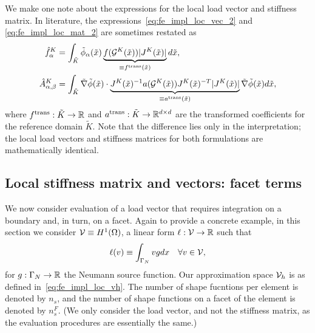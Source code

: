 We make one note about the expressions for the local load vector and stiffness matrix.  In literature, the expressions~\eqref{eq:fe_impl_loc_vec_2} and \eqref{eq:fe_impl_loc_mat_2} are sometimes restated as
\begin{align*}
  \hat f^K_\alpha
  &=
  \int_{\tilde K} \tilde \phi_\alpha(\tilde x) \underbrace{ f(\mathcal{G}^K(\tilde x)) |J^K(\tilde x)| }_{\equiv f^{\rm trans}(\tilde x)}d \tilde x, \\
  \hat A^K_{\alpha,\beta}
  &=
  \int_{\tilde K} \tilde \nabla \tilde \phi(\tilde x)
  \cdot  \underbrace{ J^K(\tilde x)^{-1} a(\mathcal{G}^K(\tilde x)) J^K(\tilde x)^{-T} |J^K(\tilde x)| }_{\equiv  a^{\rm trans}(\tilde x)}\tilde \nabla \tilde \phi(\tilde x)  d\tilde x,
\end{align*}
where $f^{\rm trans}: \tilde K \to \mathbb{R}$  and $a^{\rm trans}:\tilde K \to \mathbb{R}^{d \times d}$ are the transformed coefficients for the reference domain $\tilde K$. Note that the difference lies only in the interpretation; the local load vectors and stiffness matrices for both formulations are mathematically identical.

\subsection{Local stiffness matrix and vectors: facet terms}
We now consider evaluation of a load vector that requires integration on a boundary and, in turn, on a facet.  Again to provide a concrete example, in this section we consider $\mathcal{V} \equiv H^1(\Omega)$, a linear form $\ell: \mathcal{V} \to \mathbb{R}$ such that
\begin{equation}
  \ell(v) \equiv \int_{\Gamma_N} v g dx \quad \forall v \in \mathcal{V},
  \label{eq:fe_impl_model_g}
\end{equation}
for $g: \Gamma_N \to \mathbb{R}$ the Neumann source function. Our approximation space $\mathcal{V}_h$ is as defined in~\eqref{eq:fe_impl_loc_vh}.  The number of shape fucntions per element is denoted by $n_s$, and the number of shape functions on a facet of the element is denoted by $n_s^F$.  (We only consider the load vector, and not the stiffness matrix, as the evaluation procedures are essentially the same.)


